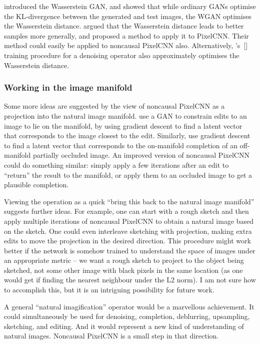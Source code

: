 \documentclass[11pt, a4paper, openany]{book}
\newcommand{\nquote}[1]{``{#1}''}
\newcommand\cites[1]{\citeauthor{#1}'s\ [\citeyear{#1}]}
\begin{document}
\citet{wgan} introduced the Wasserstein GAN, and showed that while ordinary GANs optimise the KL-divergence between the generated and test images, the WGAN optimises the Wasserstein distance. \citet{quantile} argued that the Wasserstein distance leads to better samples more generally, and proposed a method to apply it to PixelCNN. Their method could easily be applied to noncausal PixelCNN also. Alternatively, \cites{iterativeclosest} training procedure for a denoising operator also approximately optimises the Wasserstein distance.

\subsubsection{Working in the image manifold}

Some more ideas are suggested by the view of noncausal PixelCNN as a projection into the natural image manifold. \citet{manifoldmanipulation} use a GAN to constrain edits to an image to lie on the manifold, by using gradient descent to find a latent vector that corresponds to the image closest to the edit. Similarly, \citet{imageinpainting} use gradient descent to find a latent vector that corresponds to the on-manifold completion of an off-manifold partially occluded image. An improved version of noncausal PixelCNN could do something similar: simply apply a few iterations after an edit to \nquote{return} the result to the manifold, or apply them to an occluded image to get a plausible completion.

Viewing the operation as a quick \nquote{bring this back to the natural image manifold} suggests further ideas. For example, one can start with a rough sketch and then apply multiple iterations of noncausal PixelCNN to obtain a natural image based on the sketch. One could even interleave sketching with projection, making extra edits to move the projection in the desired direction. This procedure might work better if the network is somehow trained to understand the space of images under an appropriate metric -- we want a rough sketch to project to the object being sketched, not some other image with black pixels in the same location (as one would get if finding the nearest neighbour under the L2 norm). I am not sure how to accomplish this, but it is an intriguing possibility for future work.

A general \nquote{natural imagification} operator would be a marvellous achievement. It could simultaneously be used for denoising, completion, deblurring, upsampling, sketching, and editing. And it would represent a new kind of understanding of natural images. Noncausal PixelCNN is a small step in that direction.


\backmatter




\printindex
\end{document}
